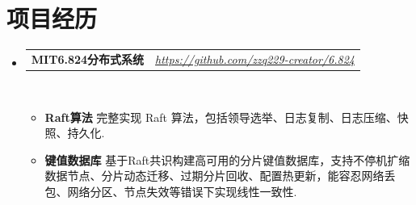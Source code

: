 \documentclass[letterpaper,11pt]{article}
\makeatletter
\newcommand{\resumeItem}[2]{
  \item\small{
    \textbf{#1}{ #2 \vspace{-2pt}}
  }
}
\newcommand{\resumeSubheadingtwo}[2]{
  \vspace{-1pt}\item
    \begin{tabular*}{0.97\textwidth}{l@{\extracolsep{\fill}}r}
      \textbf{#1} & \textit{ #2} \\
    \end{tabular*}\vspace{-5pt}
}
\newcommand{\resumeItemListStart}{\vspace{-10pt}\begin{itemize}}
\newcommand{\resumeItemListEnd}{\end{itemize}\vspace{-10pt}}
\makeatother
\begin{document}
\section{项目经历}
    \begin{itemize}[leftmargin=*,itemsep=5pt]
        \resumeSubheadingtwo
            {MIT6.824分布式系统}{\href{https://github.com/zzq229-creator/6.824}{https://github.com/zzq229-creator/6.824}}
            \\[10pt]
            \resumeItemListStart
                \resumeItem{Raft算法}
                    {完整实现 Raft 算法，包括领导选举、日志复制、日志压缩、快照、持久化.}
                \resumeItem{键值数据库}
                    {基于Raft共识构建高可用的分片键值数据库，支持不停机扩缩数据节点、分片动态迁移、过期分片回收、配置热更新，能容忍网络丢包、网络分区、节点失效等错误下实现线性一致性.
                    }
            \resumeItemListEnd

    \end{itemize}

\vspace{-10pt}
\end{document}
